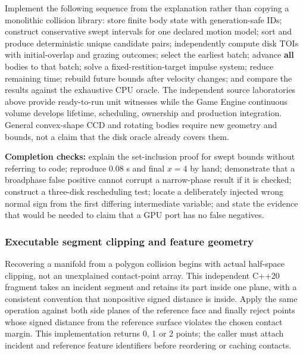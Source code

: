 Implement the following sequence from the explanation rather than copying a monolithic collision library: store finite body state with generation-safe IDs; construct conservative swept intervals for one declared motion model; sort and produce deterministic unique candidate pairs; independently compute disk TOIs with initial-overlap and grazing outcomes; select the earliest batch; advance \textbf{all} bodies to that batch; solve a fixed-restition-target impulse system; reduce remaining time; rebuild future bounds after velocity changes; and compare the results against the exhaustive CPU oracle. The independent source laboratories above provide ready-to-run unit witnesses while the Game Engine continuous volume develops lifetime, scheduling, ownership and production integration. General convex-shape CCD and rotating bodies require new geometry and bounds, not a claim that the disk oracle already covers them.

\textbf{Completion checks:} explain the set-inclusion proof for swept bounds without referring to code; reproduce \(0.08\) s and final \(x=4\) by hand; demonstrate that a broadphase false positive cannot corrupt a narrow-phase result if it is checked; construct a three-disk rescheduling test; locate a deliberately injected wrong normal sign from the first differing intermediate variable; and state the evidence that would be needed to claim that a GPU port has no false negatives.

\subsubsection{Executable segment clipping and feature geometry}\label{04-visual-computing-ii-ch026-executable-segment-clipping-and-feature-geometry}

Recovering a manifold from a polygon collision begins with actual half-space clipping, not an unexplained contact-point array. This independent C++20 fragment takes an incident segment and retains its part inside one plane, with a consistent convention that nonpositive signed distance is inside. Apply the same operation against both side planes of the reference face and finally reject points whose signed distance from the reference surface violates the chosen contact margin. This implementation returns 0, 1 or 2 points; the caller must attach incident and reference feature identifiers before reordering or caching contacts.

